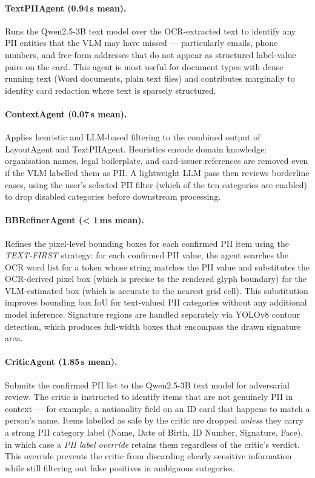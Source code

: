 \paragraph{TextPIIAgent (0.94\,s mean).}
Runs the Qwen2.5-3B text model over the OCR-extracted
text to identify any PII entities that the VLM may
have missed --- particularly emails, phone numbers,
and free-form addresses that do not appear as
structured label-value pairs on the card.
This agent is most useful for document types with
dense running text (Word documents, plain text files)
and contributes marginally to identity card redaction
where text is sparsely structured.

\paragraph{ContextAgent (0.07\,s mean).}
Applies heuristic and LLM-based filtering to the
combined output of LayoutAgent and TextPIIAgent.
Heuristics encode domain knowledge: organisation
names, legal boilerplate, and card-issuer references
are removed even if the VLM labelled them as PII.
A lightweight LLM pass then reviews borderline cases,
using the user's selected PII filter (which of the
ten categories are enabled) to drop disabled categories
before downstream processing.

\paragraph{BBRefinerAgent (< 1\,ms mean).}
\label{sec:bbrefiner}
Refines the pixel-level bounding boxes for each
confirmed PII item using the \emph{TEXT-FIRST}
strategy: for each confirmed PII value, the agent
searches the OCR word list for a token whose
string matches the PII value and substitutes the
OCR-derived pixel box (which is precise to the
rendered glyph boundary) for the VLM-estimated box
(which is accurate to the nearest grid cell).
This substitution improves bounding box IoU for
text-valued PII categories without any additional
model inference.
Signature regions are handled separately via YOLOv8
contour detection, which produces full-width boxes
that encompass the drawn signature area.

\paragraph{CriticAgent (1.85\,s mean).}
Submits the confirmed PII list to the Qwen2.5-3B
text model for adversarial review.
The critic is instructed to identify items that are
not genuinely PII in context --- for example, a
nationality field on an ID card that happens to match
a person's name.
Items labelled as safe by the critic are dropped
\emph{unless} they carry a strong PII category label
(Name, Date of Birth, ID Number, Signature, Face),
in which case a \textit{PII label override} retains
them regardless of the critic's verdict.
This override prevents the critic from discarding
clearly sensitive information while still filtering
out false positives in ambiguous categories.

